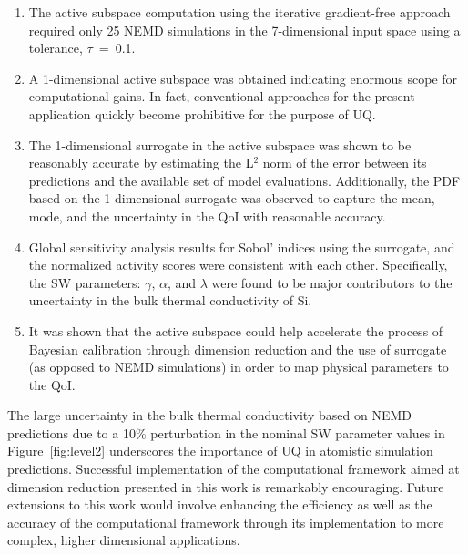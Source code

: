 \begin{enumerate}
\item The active subspace computation using the iterative gradient-free approach
required only 25 NEMD simulations in the 7-dimensional input space using a tolerance, 
$\tau$~=~0.1.

\item A 1-dimensional active subspace was obtained indicating enormous scope for
computational gains. In fact, conventional
approaches for the present application quickly become prohibitive for
the purpose of UQ. 

\item The 1-dimensional surrogate in the active subspace was shown to be reasonably accurate
by estimating the L$^2$ norm of the error between its predictions and the available set of
model evaluations. Additionally, the PDF based on the 1-dimensional surrogate was 
observed to capture the mean, mode, and the uncertainty in the QoI with reasonable accuracy.

\item Global sensitivity analysis results for Sobol' indices using the surrogate, and the
normalized activity scores were consistent with each other. Specifically, the SW parameters:
$\gamma$, $\alpha$, and $\lambda$ were found to be major contributors to the
uncertainty in the bulk thermal conductivity of Si.

\item It was shown that the active subspace could help accelerate the process
of Bayesian calibration through dimension reduction and the use of surrogate 
(as opposed to NEMD simulations) in order to map physical parameters to the QoI.    

\end{enumerate}
%
The large uncertainty in the bulk thermal conductivity based on NEMD predictions due to
a 10$\%$ perturbation in the nominal SW parameter values in Figure~\ref{fig:level2} underscores
the importance of UQ in atomistic simulation predictions. Successful implementation of the
computational framework aimed at dimension reduction presented in this work is remarkably
encouraging. Future extensions to this work would involve enhancing the efficiency as well
as the accuracy of the computational framework through its implementation to more complex,
higher dimensional applications. 
